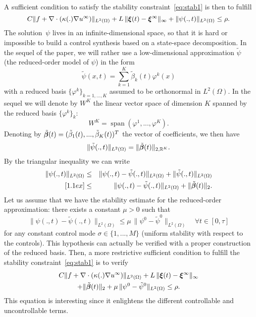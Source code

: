 %
A sufficient condition to satisfy the stability constraint~\eqref{eq:stab1} is then to fulfill 
%
\begin{equation}
C \|f+\nabla\cdot(\kappa(.)\nabla u^\infty)\|_{L^2(\Omega)} + L\,\|\bm{\xi}(t)-\bm{\xi}^\infty\|_\infty + \|\psi(.,t)\|_{L^2(\Omega)} \leq \rho.
\label{eq:26}
\end{equation}
%
The solution~$\psi$ lives in an infinite-dimensional space, so that it is hard
or impossible to build a control synthesis based on a state-space decomposition. %
In the sequel of the paper,
we will rather use a low-dimensional approximation $\tilde \psi$ (the reduced-order model of $\psi$) in the form
%
\begin{equation}
\tilde \psi(x,t) = \sum_{k=1}^K \tilde \beta_k(t) \varphi^k(x)
\end{equation}
%
with a reduced basis $\{\varphi^k\}_{k=1,...,K}$ assumed to be orthonormal in $L^2(\Omega)$.
In the sequel we will denote by $W^K$ the linear vector space of dimension $K$ spanned by the reduced basis $\{\varphi^k\}_k$:
\[
W^K = \mathop{span}\left(\varphi^1,...,\varphi^K\right).
\] 
Denoting by $\tilde {\bm{\beta}}(t)=(\tilde\beta_1(t),...,\tilde\beta_K(t))^T$
the vector of coefficients, we then have
\[
\|\tilde \psi(.,t)\|_{L^2(\Omega)} = \|\tilde{\bm{\beta}}(t)\|_{2,\mathbb{R}^K}.
\]
By the triangular inequality we can write
%
\begin{eqnarray}
\|\psi(.,t)\|_{L^2(\Omega)} &\leq& \|\psi(.,t)-\tilde\psi(.,t)\|_{L^2(\Omega)}
+\|\tilde \psi(.,t)\|_{L^2(\Omega)} \\ [1.1ex]
%
&\leq& \|\psi(.,t)-\tilde\psi(.,t)\|_{L^2(\Omega)} + \|\tilde\bbeta(t)\|_2.
\end{eqnarray}
%
Let us assume that we have the stability estimate for the reduced-order approximation: there exists a constant $\mu>0$
such that
%
\begin{equation}
\|\psi(.,t)-\tilde\psi(.,t)\|_{L^2(\Omega)} \leq \mu\, \|\psi^0-\tilde\psi^0\|_{L^2(\Omega)}
\quad \forall t\in [0,\tau]
\label{eq:stab}
\end{equation}
%
for any constant control mode $\sigma\in\{1,...,M\}$ (uniform stability with respect to the controls). 
This hypothesis can actually be verified with a proper construction
of the reduced basis. 
Then, a more restrictive sufficient condition to fulfill the stability constraint~\eqref{eq:stab1}
is to verify
%
\begin{multline}
C \|f+\nabla\cdot(\kappa(.)\nabla u^\infty)\|_{L^2(\Omega)} + L\,\|\bm{\xi}(t)-\bm{\xi}^\infty\|_\infty 
\\ + \|\tilde{\bm{\beta}}(t)\|_2
+ \mu\, \|\psi^0-\tilde \psi^0\|_{L^2(\Omega)}  \leq \rho.
\label{eq:30}
\end{multline}
%
This equation is interesting since it enlightens the different controllable and uncontrollable 
terms. 


